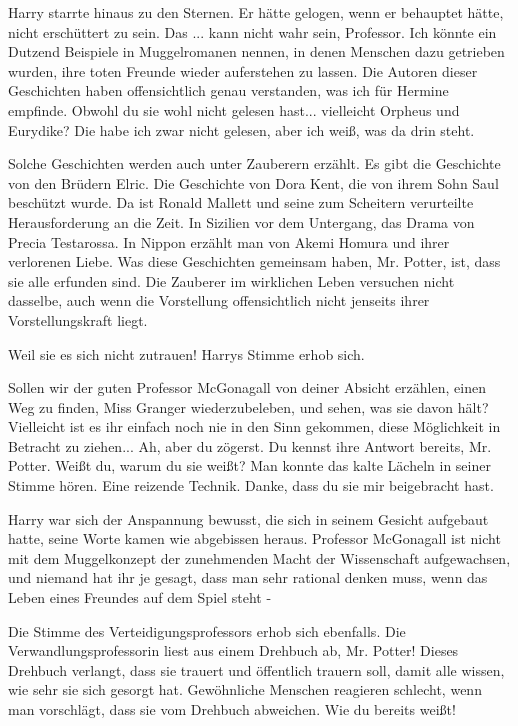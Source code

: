 Harry starrte hinaus zu den Sternen. Er hätte gelogen, wenn er behauptet hätte,
nicht erschüttert zu sein. \glqq Das ... kann nicht wahr sein, Professor. Ich
könnte ein Dutzend Beispiele in Muggelromanen nennen, in denen Menschen dazu
getrieben wurden, ihre toten Freunde wieder auferstehen zu lassen. Die Autoren
dieser Geschichten haben offensichtlich genau verstanden, was ich für Hermine
empfinde. Obwohl du sie wohl nicht gelesen hast... vielleicht Orpheus und
Eurydike? Die habe ich zwar nicht gelesen, aber ich weiß, was da drin
steht.\grqq{}

\glqq Solche Geschichten werden auch unter Zauberern erzählt. Es gibt die
Geschichte von den Brüdern Elric. Die Geschichte von Dora Kent, die von ihrem
Sohn Saul beschützt wurde. Da ist Ronald Mallett und seine zum Scheitern
verurteilte Herausforderung an die Zeit. In Sizilien vor dem Untergang, das
Drama von Precia Testarossa. In Nippon erzählt man von Akemi Homura und ihrer
verlorenen Liebe. Was diese Geschichten gemeinsam haben, Mr. Potter, ist, dass
sie alle erfunden sind. Die Zauberer im wirklichen Leben versuchen nicht
dasselbe, auch wenn die Vorstellung offensichtlich nicht jenseits ihrer
Vorstellungskraft liegt.\grqq{}

\glqq Weil sie es sich nicht zutrauen!\grqq{} Harrys Stimme erhob sich.

\glqq Sollen wir der guten Professor McGonagall von deiner Absicht erzählen,
einen Weg zu finden, Miss Granger wiederzubeleben, und sehen, was sie davon
hält? Vielleicht ist es ihr einfach noch nie in den Sinn gekommen, diese
Möglichkeit in Betracht zu ziehen... Ah, aber du zögerst. Du kennst ihre Antwort
bereits, Mr. Potter. Weißt du, warum du sie weißt?\grqq{} Man konnte das kalte
Lächeln in seiner Stimme hören. \glqq Eine reizende Technik. Danke, dass du sie
mir beigebracht hast.\grqq{}

Harry war sich der Anspannung bewusst, die sich in seinem Gesicht aufgebaut
hatte, seine Worte kamen wie abgebissen heraus. \glqq Professor McGonagall ist
nicht mit dem Muggelkonzept der zunehmenden Macht der Wissenschaft aufgewachsen,
und niemand hat ihr je gesagt, dass man sehr rational denken muss, wenn das
Leben eines Freundes auf dem Spiel steht -\grqq{}

Die Stimme des Verteidigungsprofessors erhob sich ebenfalls. \glqq Die
Verwandlungsprofessorin liest aus einem Drehbuch ab, Mr. Potter! Dieses Drehbuch
verlangt, dass sie trauert und öffentlich trauern soll, damit alle wissen, wie
sehr sie sich gesorgt hat. Gewöhnliche Menschen reagieren schlecht, wenn man
vorschlägt, dass sie vom Drehbuch abweichen. Wie du bereits weißt!\grqq{}

